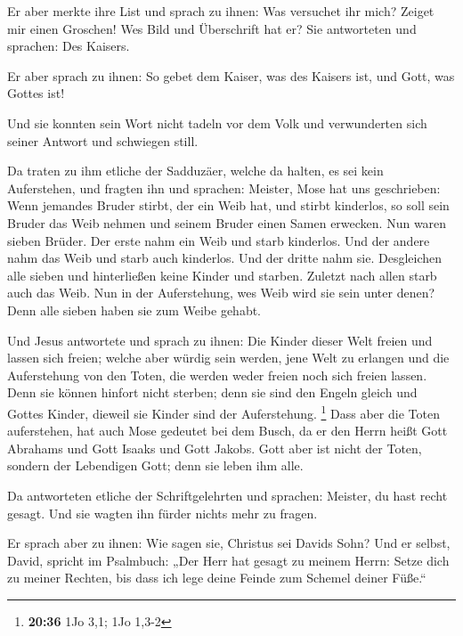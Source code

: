  Er aber merkte ihre List und sprach zu ihnen: Was
versuchet ihr mich?  Zeiget mir einen Groschen! Wes Bild
und Überschrift hat er? Sie antworteten und sprachen: Des Kaisers.

 Er aber sprach zu ihnen: So gebet dem Kaiser, was des
Kaisers ist, und Gott, was Gottes ist!

 Und sie konnten sein Wort nicht tadeln vor dem Volk und
verwunderten sich seiner Antwort und schwiegen still.

 Da traten zu ihm etliche der Sadduzäer, welche da halten,
es sei kein Auferstehen, und fragten ihn  und sprachen:
Meister, Mose hat uns geschrieben: Wenn jemandes Bruder stirbt, der ein
Weib hat, und stirbt kinderlos, so soll sein Bruder das Weib nehmen und
seinem Bruder einen Samen erwecken.  Nun waren sieben
Brüder. Der erste nahm ein Weib und starb kinderlos.  Und
der andere nahm das Weib und starb auch kinderlos.  Und der
dritte nahm sie. Desgleichen alle sieben und hinterließen keine Kinder
und starben.  Zuletzt nach allen starb auch das Weib.
 Nun in der Auferstehung, wes Weib wird sie sein unter
denen? Denn alle sieben haben sie zum Weibe gehabt.

 Und Jesus antwortete und sprach zu ihnen: Die Kinder
dieser Welt freien und lassen sich freien;  welche aber
würdig sein werden, jene Welt zu erlangen und die Auferstehung von den
Toten, die werden weder freien noch sich freien lassen. 
Denn sie können hinfort nicht sterben; denn sie sind den Engeln gleich
und Gottes Kinder, dieweil sie Kinder sind der Auferstehung. \footnote{\textbf{20:36}
  1Jo 3,1; 1Jo 1,3-2}  Dass aber die Toten auferstehen, hat
auch Mose gedeutet bei dem Busch, da er den Herrn heißt Gott Abrahams
und Gott Isaaks und Gott Jakobs.  Gott aber ist nicht der
Toten, sondern der Lebendigen Gott; denn sie leben ihm alle.

 Da antworteten etliche der Schriftgelehrten und sprachen:
Meister, du hast recht gesagt.  Und sie wagten ihn fürder
nichts mehr zu fragen.

 Er sprach aber zu ihnen: Wie sagen sie, Christus sei
Davids Sohn?  Und er selbst, David, spricht im Psalmbuch:
„Der Herr hat gesagt zu meinem Herrn: Setze dich zu meiner Rechten,
 bis dass ich lege deine Feinde zum Schemel deiner Füße.``

